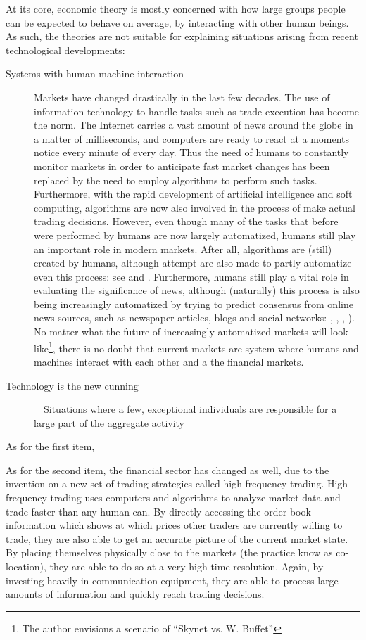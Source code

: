 \documentclass{article}
\begin{document}
At its core, economic theory is mostly concerned with how large groups people can be expected to behave on average, by interacting with other human beings. As such, the theories are not suitable for explaining situations arising from recent technological developments:
\begin{description}
\item[Systems with human-machine interaction] Markets have changed drastically in the last few decades. The use of information technology to handle tasks such as trade execution has become the norm. The Internet carries a vast amount of news around the globe in a matter of milliseconds, and computers are ready to react at a moments notice every minute of every day. Thus the need of humans to constantly monitor markets in order to anticipate fast market changes has been replaced by the need to employ algorithms to perform such tasks. Furthermore, with the rapid development of artificial intelligence and soft computing, algorithms are now also involved in the process of make actual trading decisions. However, even though many of the tasks that before were performed by humans are now largely automatized, humans still play an important role in modern markets. After all, algorithms are (still) created by humans, although attempt are also made to partly automatize even this process: see \cite{allen1999using} and \cite{potvin2004generating}. Furthermore, humans still play a vital role in evaluating the significance of news, although (naturally) this process is also being increasingly automatized by trying to predict consensus from online news sources, such as newspaper articles, blogs and social networks: \cite{devitt2007sentiment}, \cite{koppel2006good}, \cite{godbole2007large}, \cite{bollen2011twitter}). No matter what the future of increasingly automatized markets will look like\footnote{The author envisions a scenario of ``Skynet vs. W. Buffet''}, there is no doubt that current markets are system where humans and machines interact with each other and a the financial markets. 
\item[Technology is the new cunning]　Situations where a few, exceptional individuals are responsible for a large part of the aggregate activity
\end{description}
As for the first item, 

As for the second item, the financial sector has changed as well, due to the invention on a new set of trading strategies called high frequency trading. High frequency trading uses computers and algorithms to analyze market data and trade faster than any human can. By directly accessing the order book information which shows at which prices other traders are currently willing to trade, they are also able to get an accurate picture of the current market state. By placing themselves physically close to the markets (the practice know as co-location), they are able to do so at a very high time resolution. Again, by investing heavily in communication equipment, they are able to process large amounts of information and quickly reach trading decisions.
\end{document}
